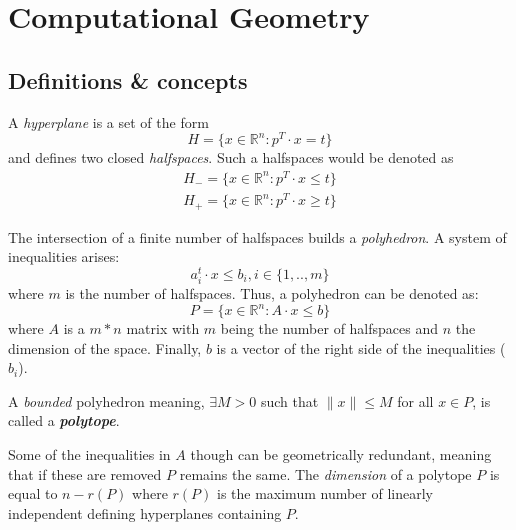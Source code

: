 \chapter{Computational Geometry}
\label{app:comp_geom_intro}

\section{Definitions \& concepts}



   A \textit{hyperplane} is a set of the form
   \begin{equation}
      H = \{x \in \mathbb{R}^n : p^{T} \cdot x = t \}      
   \end{equation}
   and defines two closed \textit{halfspaces}.
   Such a halfspaces would be denoted as
   \begin{equation}
      \begin{split}
         H_{-} = \{ x \in \mathbb{R}^n : p^{T} \cdot x \leq t \} \\
         H_{+} = \{ x \in \mathbb{R}^n : p^{T} \cdot x \geq t \}               
      \end{split}
   \end{equation}

   The intersection of a finite number of halfspaces builds a \textit{polyhedron}.
   A system of inequalities arises:
   \begin{equation}
      a_{i}^{t} \cdot x \leq b_{i},  i \in \{1, .., m\}      
   \end{equation} 
   where $m$ is the number of halfspaces. 
   Thus, a polyhedron can be denoted as:
   \begin{equation}
      P = \{ x \in \mathbb{R}^n : A \cdot x \leq b \}
   \end{equation}
   where $A$ is a $m*n$ matrix
   with $m$ being the number of halfspaces 
   and $n$ the dimension of the space. 
   Finally, $b$ is a vector of the right side of the inequalities ($b_{i}$).
   
   A \textit{bounded} polyhedron meaning, 
   $ \exists M > 0$ such that $\|x\| \leq M$ for all $x \in P$,
   is called a \textit{\textbf{polytope}}.
   
   Some of the inequalities in $A$ though can be geometrically redundant,
   meaning that if these are removed $P$ remains the same. 
   The \textit{dimension} of a polytope $P$ is equal to $n - r(P)$
   where $r(P)$ is the maximum number of linearly independent 
   defining hyperplanes containing $P$.

